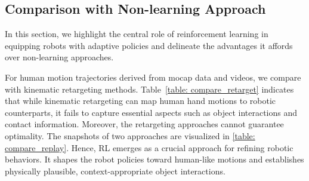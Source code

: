 

\subsection{Comparison with Non-learning Approach}
In this section, we highlight the central role of reinforcement learning in equipping robots with adaptive policies and delineate the advantages it affords over non-learning approaches.

\begin{table}[h]
\centering
\caption{Comparison of \ourshort and kinematic retargeting.}
\label{table: compare_retarget}
\end{table}


For human motion trajectories derived from mocap data and videos, we compare \ourshort with kinematic retargeting methods. Table~\ref{table: compare_retarget} indicates that while kinematic retargeting can map human hand motions to robotic counterparts, it fails to capture essential aspects such as object interactions and contact information. Moreover, the retargeting approaches cannot guarantee optimality. The snapshots of two approaches are visualized in \ref{table: compare_replay}. Hence, RL emerges as a crucial approach for refining robotic behaviors. It shapes the robot policies toward human-like motions and establishes physically plausible, context-appropriate object interactions.

